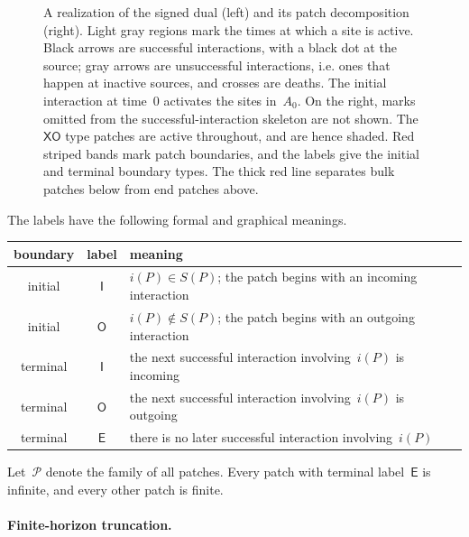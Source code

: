 \begin{figure}[htbp]
\centering
\resizebox{\linewidth}{!}{}
\caption{A realization of the signed dual (left) and its patch decomposition
(right). Light gray regions mark the times at which a site is active.
Black arrows are successful interactions, with a black dot at the source; gray
arrows are unsuccessful interactions, i.e. ones that happen at inactive sources, and crosses are deaths. The initial
interaction at time~$0$ activates the sites in~$A_0$. On the right, marks
omitted from the successful-interaction skeleton are not shown. The~$\mathsf{XO}$ type patches are active throughout, and are hence shaded. Red striped
bands mark patch boundaries, and the labels give the initial and terminal
boundary types. The thick red line separates bulk patches below from end
patches above.}
\label{fig:patch-geometry}
\end{figure}
\FloatBarrier

The labels have the following formal and graphical meanings.
\begin{center}
\small
\begin{tabularx}{\textwidth}{@{}c c >{\raggedright\arraybackslash}X@{}}
\hline
boundary & label & meaning \\
\hline
initial & $\mathsf I$ & $i(P)\in S(P)$; the patch begins with an incoming interaction \\
initial & $\mathsf O$ & $i(P)\notin S(P)$; the patch begins with an outgoing interaction \\
terminal & $\mathsf I$ & the next successful interaction involving~$i(P)$ is incoming \\
terminal & $\mathsf O$ & the next successful interaction involving~$i(P)$ is outgoing \\
terminal & $\mathsf E$ & there is no later successful interaction involving~$i(P)$ \\
\hline
\end{tabularx}
\end{center}
Let~$\mathcal P$ denote the family of all patches. Every patch
with terminal label~$\mathsf E$ is infinite, and every other patch is finite.

\paragraph{Finite-horizon truncation.}
\label{subsec:patch-truncation}

